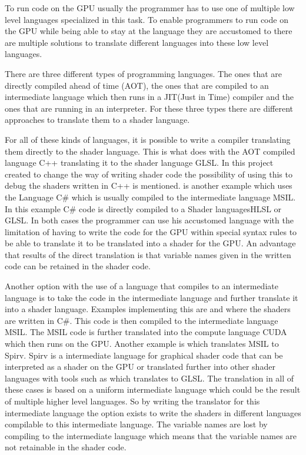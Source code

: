 To run code on the GPU usually the programmer has to use one of  multiple low level languages specialized in this task. To enable programmers to run code on the GPU while being able to stay at the language they are accustomed to there are multiple solutions to translate different languages into these low level languages.

There are three different types of programming languages. The ones that are directly compiled ahead of time (AOT), the ones that are compiled to an intermediate language which then runs in a JIT(Just in Time) compiler and the ones that are running in an interpreter. For these three types there are different approaches to translate them to a shader language.

For all of these kinds of languages, it is possible to write a compiler translating them directly to the shader language. This is what  does with the AOT compiled language C++ translating it to the shader language GLSL. In this project created to change the way of writing shader code the possibility of using this to debug the shaders written in C++ is mentioned.  is another example which uses the Language C\# which is usually compiled to the intermediate language MSIL. In this example C\# code is directly compiled to a Shader languagesHLSL or GLSL. In both cases the programmer can use his accustomed language with the limitation of having to write the code for the GPU within special syntax rules to be able to translate it to be translated into a shader for the GPU. An advantage that results of the direct translation is that variable names given in the written code can be retained in the shader code.

Another option with the use of a language that compiles to an intermediate language is to take the code in the intermediate language and further translate it into a shader language. Examples implementing this are  and  where the shaders are written in C\#. This code is then compiled to the intermediate language MSIL. The MSIL code is further translated into the compute language CUDA which then runs on the GPU. Another example is  which translates MSIL to Spirv. Spirv is a intermediate language for graphical shader code that can be interpreted as a shader on the GPU or translated further into other shader languages with tools such as  which translates to GLSL. The translation in all of these cases is based on a uniform intermediate language which could be the result of multiple higher level languages. So by writing the translator for this intermediate language the option exists to write the shaders in different languages compilable to this intermediate language. The variable names are lost by compiling to the intermediate language which means that the variable names are not retainable in the shader code.

